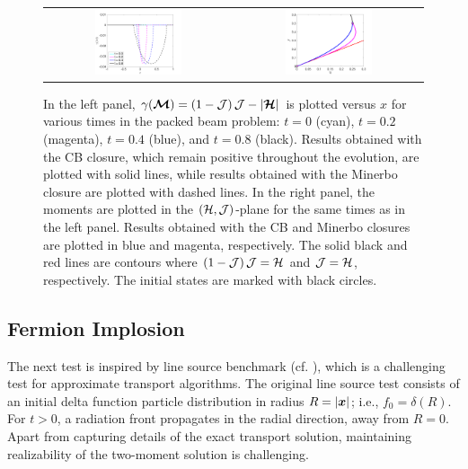 \begin{figure}[H]
  \centering
  \begin{tabular}{cc}
    \includegraphics[width=0.485\textwidth]{figures/PackedBeam_Realizability} &
    \includegraphics[width=0.485\textwidth]{figures/PackedBeam_RealizableDomain}
  \end{tabular}
   \caption{In the left panel, $\gamma(\boldsymbol{\mathcal{M}})=(1-\mathcal{J})\,\mathcal{J}-|\boldsymbol{\mathcal{H}}|$ is plotted versus $x$ for various times in the packed beam problem: $t=0$ (cyan), $t=0.2$ (magenta), $t=0.4$ (blue), and $t=0.8$ (black).  Results obtained with the CB closure, which remain positive throughout the evolution, are plotted with solid lines, while results obtained with the Minerbo closure are plotted with dashed lines.  In the right panel, the moments are plotted in the $(\mathcal{H},\mathcal{J})$-plane for the same times as in the left panel.  Results obtained with the CB and Minerbo closures are plotted in blue and magenta, respectively.  The solid black and red lines are contours where $(1-\mathcal{J})\,\mathcal{J}=\mathcal{H}$ and $\mathcal{J}=\mathcal{H}$, respectively.  The initial states are marked with black circles.}
  \label{fig:PackedBeam_Realizability}
\end{figure}

\subsection{Fermion Implosion}
\label{sec:fermionImplosion}

The next test is inspired by line source benchmark (cf. \cite{brunner_2002,garrettHauck_2013}), which is a challenging test for approximate transport algorithms.  
The original line source test consists of an initial delta function particle distribution in radius $R=|\boldsymbol{x}|$; i.e., $f_{0}=\delta(R)$.  
For $t>0$, a radiation front propagates in the radial direction, away from $R=0$.  
Apart from capturing details of the exact transport solution, maintaining realizability of the two-moment solution is challenging.  

